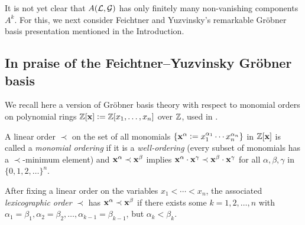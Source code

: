 \begin{comment}
\begin{remark}
\begin{itemize}
    \item $A(\L, \G)$ depends
only upon the associated {\it simple matroid} of $\M$.  That is,
one may assume $\M$ has
\begin{itemize}
    \item  no {\it loops}, meaning that one has empty 
intersection  $\varnothing = \bigcap_{F \in \L_\M} F$, and
\end{itemize}
Thus without loss of generality,
one may assume that $\M$ is a simple matroid throughout.
\end{itemize}
\end{remark}
\end{comment}



It is not yet clear that $A(\mathcal{L}, \mathcal{G})$ has only
finitely many non-vanishing components $A^k$.
For this, we next 
consider Feichtner and Yuzvinsky's remarkable Gr\"obner basis presentation
mentioned in the Introduction.

\subsection{In praise of the Feichtner--Yuzvinsky Gr\"obner basis}

We recall here a version of Gr\"obner basis theory with respect to monomial orders on polynomial rings 
$
\mathbb{Z}[\mathbf{x}]:=\mathbb{Z}[x_1,\ldots,x_n]
$
over $\mathbb{Z}$, used in \cite{FY}.

\begin{defn}\rm
A linear order $\prec$ on the set of all monomials $\{ \mathbf{x}^\alpha:=x_1^{\alpha_1} \cdots x_n^{\alpha_n}\}$ in $\mathbb{Z}[\mathbf{x}]$ is called a {\it monomial ordering}
if it is a {\it well-ordering} (every subset of monomials has a $\prec$-minimum element) and $\mathbf{x}^\alpha \prec \mathbf{x}^\beta$ implies
$\mathbf{x}^\alpha \cdot \mathbf{x}^\gamma \prec \mathbf{x}^\beta \cdot \mathbf{x}^\gamma$
for all $\alpha,\beta,\gamma$ in $\{0,1,2,\ldots\}^n$.
\end{defn}

\begin{example} \rm
After fixing a linear order on the variables $x_1 < \cdots < x_n$,
the associated {\it lexicographic order} $\prec$ has
$\mathbf{x}^\alpha \prec \mathbf{x}^\beta$ if there exists some $k=1,2,\ldots,n$ with  $\alpha_1 = \beta_1, \alpha_2=\beta_2,\ldots,\alpha_{k-1} = \beta_{k-1}$,
but $\alpha_k < \beta_k$.
\end{example}

